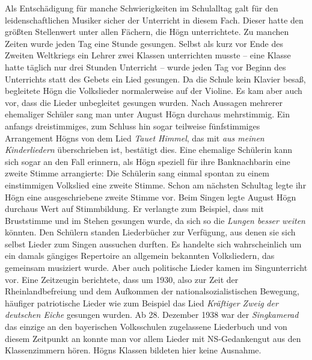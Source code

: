 \documentclass{book}
\newcommand{\zitat}[1]{\textit{#1}}
\begin{document}
Als Entschädigung für manche Schwierigkeiten im Schulalltag galt für den
leidenschaftlichen Musiker sicher der Unterricht in diesem Fach. Dieser
hatte den größten Stellenwert unter allen Fächern, die Högn
unterrichtete. Zu man\-chen Zeiten wurde jeden Tag eine Stunde
gesungen. Selbst als kurz vor Ende des Zweiten Weltkriegs ein Lehrer
zwei Klassen unterrichten musste – eine Klasse hatte täglich nur drei
Stunden Unterricht – wurde jeden Tag vor Be\-ginn des Unterrichts statt
des Gebets ein Lied gesungen. Da die Schule kein Klavier besaß,
begleitete Högn die Volkslieder normalerweise auf der Violine. Es kam
aber auch vor, dass die Lieder unbegleitet gesungen wurden. Nach
Aussagen mehrerer ehemaliger Schüler sang man unter August Högn
durch\-aus mehrstimmig. Ein anfangs dreistimmiges, zum Schluss hin
sogar teilweise fünfstimmiges Arrangement Högns von dem Lied
\textit{Tauet Himmel}, das mit \textit{aus meinen Kinderliedern}
überschrieben ist, bestätigt dies. Eine ehemalige Schülerin kann sich
sogar an den Fall erinnern, als Högn speziell für ihre Banknachbarin
eine zweite Stimme arrangierte: Die Schülerin sang einmal spontan zu
einem einstimmigen Volkslied eine zweite Stimme. Schon am nächsten
Schultag legte ihr Högn eine ausgeschriebene zweite Stimme vor. Beim
Singen legte August Högn durchaus Wert auf Stimmbildung. Er verlangte
zum Beispiel, dass mit Bruststimme und im Stehen gesungen wurde, da
sich so die \zitat{Lungen besser weiten }könnten. Den
Schülern standen Liederbücher zur Verfügung, aus denen sie sich selbst
Lieder zum Singen aussuchen durften. Es handelte sich wahr\-scheinlich
um ein damals gängiges Repertoire an allgemein bekannten
Volks\-liedern, das gemeinsam musiziert wurde. Aber auch politische
Lieder kamen im Singunterricht vor. Eine Zeitzeugin berichtete, dass um
1930, also zur Zeit der Rheinlandbefreiung und dem Aufkommen der
nationalsozialistischen Bewegung, häufiger patriotische Lieder wie zum
Beispiel das Lied \textit{Kräftiger Zweig} \textit{der deutschen Eiche}
gesungen wurden. Ab 28. Dezember 1938 war der \textit{Sing\-kamerad}
das einzige an den bayerischen Volksschulen zugelassene Liederbuch und
von diesem Zeitpunkt an konnte man vor allem Lieder mit
NS-Gedan\-kengut aus den Klassenzimmern hören. Högns Klassen bildeten
hier keine Ausnahme.

\end{document}

